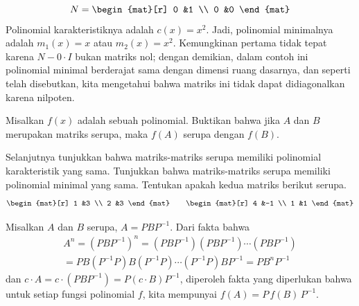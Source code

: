 \begin{exercises}
\begin{answer}
\begin{equation*}
        N=
        \begin{mat}[r]
          0  &1  \\
          0  &0
        \end{mat}
      \end{equation*}
      Polinomial karakteristiknya adalah $c(x)=x^2$.
      Jadi, polinomial minimalnya adalah $m_1(x)=x$ atau $m_2(x)=x^2$.
      Kemungkinan pertama tidak tepat karena $N-0\cdot I$ bukan matriks nol;
      dengan demikian, dalam contoh ini polinomial minimal berderajat sama dengan
      dimensi ruang dasarnya, dan seperti telah disebutkan,
      kita mengetahui bahwa matriks ini tidak dapat didiagonalkan karena nilpoten.
    \end{answer}
   \item 
     Misalkan $f(x)$ adalah sebuah polinomial.
     Buktikan bahwa jika $A$ dan $B$ merupakan matriks serupa, maka $f(A)$
     serupa dengan $f(B)$.
     \begin{exparts}
       \partsitem Selanjutnya tunjukkan bahwa matriks-matriks serupa memiliki
         polinomial karakteristik yang sama.
       \partsitem Tunjukkan bahwa matriks-matriks serupa memiliki polinomial minimal yang sama.
       \partsitem Tentukan apakah kedua matriks berikut serupa.
          \begin{equation*}
            \begin{mat}[r]
              1  &3  \\
              2  &3
            \end{mat}
            \qquad
            \begin{mat}[r]
              4  &-1 \\
              1  &1
            \end{mat}
          \end{equation*}
     \end{exparts}
     \begin{answer}
       Misalkan \( A \) dan \( B \) serupa, \( A=PBP^{-1} \).
       Dari fakta bahwa
       \begin{multline*}
           A^n=(PBP^{-1})^n=(PBP^{-1})(PBP^{-1})\cdots(PBP^{-1})   \\
                           =PB(P^{-1}P)B(P^{-1}P)\cdots (P^{-1}P)BP^{-1}
                           =PB^nP^{-1}
       \end{multline*}
       dan $c\cdot A=c\cdot(PBP^{-1})=P(c\cdot B)P^{-1}$, diperoleh
       fakta yang diperlukan bahwa untuk setiap fungsi polinomial $f$, kita mempunyai
       \( f(A)=P\,f(B)\,P^{-1} \).

\end{answer}
\end{exercises}
